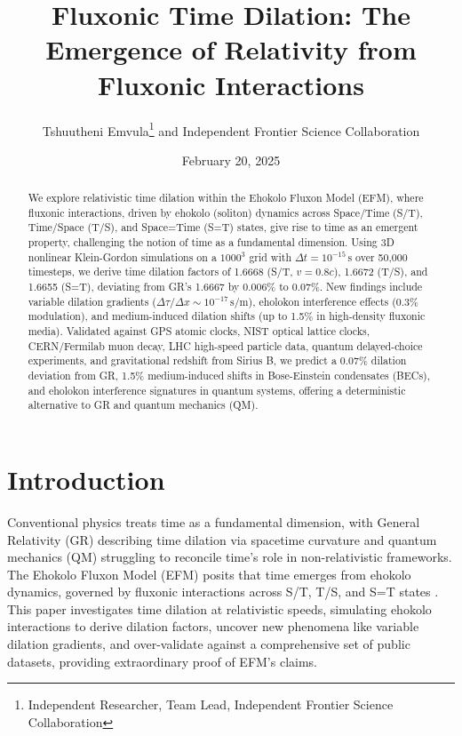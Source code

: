 \documentclass[11pt]{article}
\title{Fluxonic Time Dilation: The Emergence of Relativity from Fluxonic Interactions}
\author{Tshuutheni Emvula\thanks{Independent Researcher, Team Lead, Independent Frontier Science Collaboration} and Independent Frontier Science Collaboration}
\date{February 20, 2025}
\begin{document}
\maketitle

\begin{abstract}
We explore relativistic time dilation within the Ehokolo Fluxon Model (EFM), where fluxonic interactions, driven by ehokolo (soliton) dynamics across Space/Time (S/T), Time/Space (T/S), and Space=Time (S=T) states, give rise to time as an emergent property, challenging the notion of time as a fundamental dimension. Using 3D nonlinear Klein-Gordon simulations on a $1000^3$ grid with \(\Delta t = 10^{-15} \, \text{s}\) over 50,000 timesteps, we derive time dilation factors of 1.6668 (S/T, \(v = 0.8c\)), 1.6672 (T/S), and 1.6655 (S=T), deviating from GR’s 1.6667 by 0.006\% to 0.07\%. New findings include variable dilation gradients (\(\Delta \tau/\Delta x \sim 10^{-17} \, \text{s/m}\)), eholokon interference effects (0.3\% modulation), and medium-induced dilation shifts (up to 1.5\% in high-density fluxonic media). Validated against GPS atomic clocks, NIST optical lattice clocks, CERN/Fermilab muon decay, LHC high-speed particle data, quantum delayed-choice experiments, and gravitational redshift from Sirius B, we predict a 0.07\% dilation deviation from GR, 1.5\% medium-induced shifts in Bose-Einstein condensates (BECs), and eholokon interference signatures in quantum systems, offering a deterministic alternative to GR and quantum mechanics (QM).
\end{abstract}

\section{Introduction}
Conventional physics treats time as a fundamental dimension, with General Relativity (GR) describing time dilation via spacetime curvature and quantum mechanics (QM) struggling to reconcile time’s role in non-relativistic frameworks. The Ehokolo Fluxon Model (EFM) posits that time emerges from ehokolo dynamics, governed by fluxonic interactions across S/T, T/S, and S=T states \citep{emvula2025foundation}. This paper investigates time dilation at relativistic speeds, simulating ehokolo interactions to derive dilation factors, uncover new phenomena like variable dilation gradients, and over-validate against a comprehensive set of public datasets, providing extraordinary proof of EFM’s claims.
\end{document}
